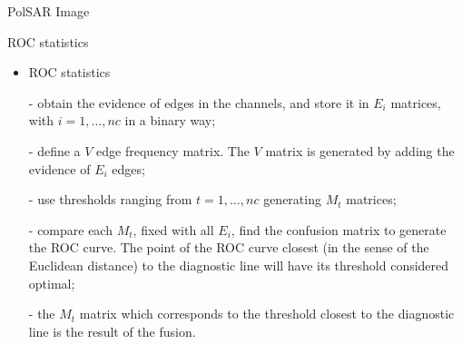 \documentclass[10pt]{beamer}
\begin{document}
\begin{frame}[fragile]{PolSAR Image}
\begin{alertblock}{ROC statistics}
\begin{itemize}
	\item ROC statistics
	\item[-] obtain the evidence of edges in the channels, and store it in $E_i$ matrices, with $i=1,\dots,nc$ in a binary way;
\item[-] define a $V$ edge frequency matrix. The $V$ matrix is generated by adding the evidence of $E_i$ edges;
\item[-] use thresholds ranging from $t=1,\dots,nc$ generating $M_t$ matrices;
\item[-] compare each $M_t$, fixed with all $E_i$, find the confusion matrix to generate the ROC curve. The point of the ROC curve closest (in the sense of the Euclidean distance) to the diagnostic line will have its threshold considered optimal;
\item[-] the $M_t$ matrix which corresponds to the threshold closest to the diagnostic line is the result of the fusion.
\end{itemize}
\end{alertblock}
\end{frame}
\end{document}

